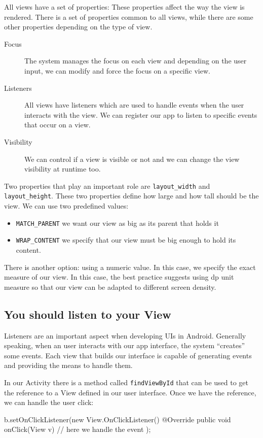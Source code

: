 All views have a set of properties: These properties affect the way the view is rendered. There is a set of properties common
to all views, while there are some other properties depending on the type of view.

\begin{description}
	\item[Focus] The system manages the focus on each view and depending on the user input, we can modify and force the focus on a
	specific view.
	\item[Listeners] All views have listeners which are used to handle events when the user interacts with the view. We can register our
	app to listen to specific events that occur on a view.
	\item[Visibility] We can control if a view is visible or not and we can change the view visibility at runtime too.
\end{description}
Two properties that play an important role are \texttt{layout\_width} and \texttt{layout\_height}. These two properties define how large
and how tall should be the view. We can use two predefined values:
\begin{itemize}
	\item \texttt{MATCH\_PARENT} we want our view as big as its parent that holds it
	\item \texttt{WRAP\_CONTENT} we
	specify that our view must be big enough to hold its content.
\end{itemize}
There is another option: using a numeric value. In this case, we specify the exact measure of our view. In this case, the best
practice suggests using dp unit measure so that our view can be adapted to different screen density.


\subsection{You should listen to your View}
Listeners are an important aspect when developing UIs in Android. Generally speaking, when an user interacts with our app
interface, the system “creates” some events. Each view that builds our interface is capable of generating events and providing the means to handle them.

In our Activity there is a method called \texttt{findViewById} that can be used to get the reference to a View defined in our user
interface. Once we have the reference, we can handle the user click:

\begin{android}
b.setOnClickListener(new View.OnClickListener() {
	@Override
	public void onClick(View v) {
		// here we handle the event
	}
});	
\end{android}

